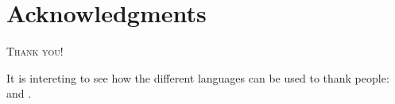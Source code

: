 \thispagestyle{empty}
\chapter*{Acknowledgments}


\lettrine{T}{hank you!}
\lipsum[1-2]

It is intereting to see how the different languages
can be used to thank people:
 and .
